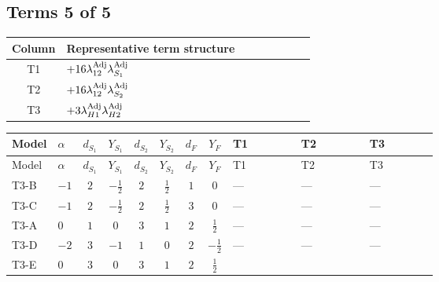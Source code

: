 \documentclass[8pt]{article}
\begin{document}
\begin{landscape}
\subsection*{Terms 5 of 5}
\begin{center}
\begin{tabular}{@{}c >{\raggedright\arraybackslash}p{0.82\linewidth}@{}}
\toprule
Column & Representative term structure \\
\midrule
T1 & \(\displaystyle +16 {\lambda_{12}^{\rm Adj}} {\lambda_{S_1}^{\rm Adj}}\) \\
\midrule
T2 & \(\displaystyle +16 {\lambda_{12}^{\rm Adj}} {\lambda_{S_2}^{\rm Adj}}\) \\
\midrule
T3 & \(\displaystyle +3 {\lambda_{H1}^{\rm Adj}} {\lambda_{H2}^{\rm Adj}}\) \\
\midrule
\bottomrule
\end{tabular}
\end{center}
\smallskip
\tiny
\begin{longtable}{@{}llcccccc >{\raggedright\arraybackslash}p{0.21\linewidth} >{\raggedright\arraybackslash}p{0.21\linewidth} >{\raggedright\arraybackslash}p{0.21\linewidth}@{}}
\toprule
Model & $\alpha$ & $d_{S_1}$ & $Y_{S_1}$ & $d_{S_2}$ & $Y_{S_2}$ & $d_F$ & $Y_F$ & T1 & T2 & T3 \\
\midrule
\endfirsthead
\toprule
Model & $\alpha$ & $d_{S_1}$ & $Y_{S_1}$ & $d_{S_2}$ & $Y_{S_2}$ & $d_F$ & $Y_F$ & T1 & T2 & T3 \\
\midrule
\endhead
T3-B & $-1$ & $2$ & $-\frac{1}{2}$ & $2$ & $\frac{1}{2}$ & $1$ & $0$ & --- & --- & --- \\
\midrule
T3-C & $-1$ & $2$ & $-\frac{1}{2}$ & $2$ & $\frac{1}{2}$ & $3$ & $0$ & --- & --- & --- \\
\midrule
T3-A & $0$ & $1$ & $0$ & $3$ & $1$ & $2$ & $\frac{1}{2}$ & --- & --- & --- \\
\midrule
T3-D & $-2$ & $3$ & $-1$ & $1$ & $0$ & $2$ & $-\frac{1}{2}$ & --- & --- & --- \\
\midrule
T3-E & $0$ & $3$ & $0$ & $3$ & $1$ & $2$ & $\frac{1}{2}$ & \scriptsize\adjustbox{max width=\linewidth}{$\begin{gathered} +16 {\lambda_{12}^{\rm Adj}} {\lambda_{S_1}^{\rm Adj}}\end{gathered}$} & \scriptsize\adjustbox{max width=\linewidth}{$\begin{gathered} +16 {\lambda_{12}^{\rm Adj}} {\lambda_{S_2}^{\rm Adj}}\end{gathered}$} & \scriptsize\adjustbox{max width=\linewidth}{$\begin{gathered} +3 {\lambda_{H1}^{\rm Adj}} {\lambda_{H2}^{\rm Adj}}\end{gathered}$} \\
\midrule
\bottomrule
\end{longtable}
\clearpage

\end{landscape}
\end{document}
